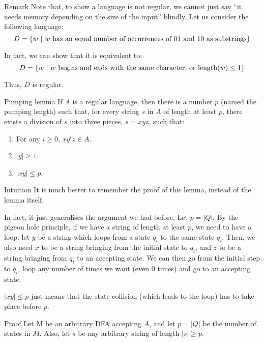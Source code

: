 \documentclass[a4paper]{article}
\begin{document}
\begin{parag}{Remark}
    Note that, to show a language is not regular, we cannot just say ``it needs memory depending on the size of the input'' blindly. Let us consider the following language: 
    \[D = \left\{w \suchthat w \text{ has an equal number of occurrences of 01 and 10 as substrings}\right\}\]
    
    In fact, we can show that it is equivalent to: 
    \[D = \left\{w \suchthat w \text{ begins and ends with the same character, or } \text{length}\left(w\right) \leq 1\right\}\]

    Thus, $D$ is regular.
\end{parag}

\begin{parag}{Pumping lemma}
    If $A$ is a regular language, then there is a number $p$ (named the pumping length) such that, for every string $s$ in $A$ of length at least $p$, there exists a division of $s$ into three pieces, $s = xyz$, such that:
    \begin{enumerate}
        \item For any $i \geq 0$, $x y^i z \in A$.
        \item $\left|y\right| \geq 1$.
        \item $\left|xy\right| \leq p$.
    \end{enumerate}
    
    \begin{subparag}{Intuition}
        It is much better to remember the proof of this lemma, instead of the lemma itself.

        In fact, it just generalises the argument we had before. Let $p = \left|Q\right|$. By the pigeon hole principle, if we have a string of length at least $p$, we need to have a loop: let $y$ be a string which loops from a state $q_i$ to the same state $q_i$. Then, we also need $x$ to be a string bringing from the initial state to $q_i$, and $z$ to be a string bringing from $q_i$ to an accepting state. We can then go from the initial step to $q_i$, loop any number of times we want (even 0 times) and go to an accepting state.


        $\left|xy\right| \leq p$ just means that the state collision (which leads to the loop) has to take place before $p$.
    \end{subparag}

    \begin{subparag}{Proof}
        Let M be an arbitrary DFA accepting $A$, and let $p = \left|Q\right|$ be the number of states in $M$. Also, let $s$ be any arbitrary string of length $\left|s\right| \geq p$.


\end{subparag}
\end{parag}
\end{document}
